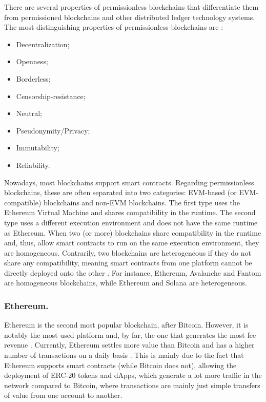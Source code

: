 \documentclass[runningheads]{llncs}
\begin{document}
There are several properties of permissionless blockchains that differentiate them from permissioned blockchains and other distributed ledger technology systems. The most distinguishing properties of permissionless blockchains are \cite{lopp_2020}:
\begin{itemize}
    \item Decentralization;
    \item Openness;
    \item Borderless;
    \item Censorship-resistance;
    \item Neutral;
    \item Pseudonymity/Privacy;
    \item Immutability;
    \item Reliability.
\end{itemize}

Nowadays, most blockchains support smart contracts. Regarding permissionless blockchains, these are often separated into two categories: EVM-based (or EVM-compatible) blockchains and non-EVM blockchains. The first type uses the Ethereum Virtual Machine and shares compatibility in the runtime. The second type uses a different execution environment and does not have the same runtime as Ethereum. When two (or more) blockchains share compatibility in the runtime and, thus, allow smart contracts to run on the same execution environment, they are homogeneous. Contrarily, two blockchains are heterogeneous if they do not share any compatibility, meaning smart contracts from one platform cannot be directly deployed onto the other \cite{abrunhosa_2021}. For instance, Ethereum, Avalanche and Fantom are homogeneous blockchains, while Ethereum and Solana are heterogeneous.

\subsubsection{Ethereum.}
Ethereum is the second most popular blockchain, after Bitcoin. However, it is notably the most used platform and, by far, the one that generates the most fee revenue \cite{fees}. Currently, Ethereum settles more value than Bitcoin \cite{movers} and has a higher number of transactions on a daily basis \cite{glassnode_btc,glassnode_eth}. This is mainly due to the fact that Ethereum supports smart contracts (while Bitcoin does not), allowing the deployment of ERC-20 tokens and dApps, which generate a lot more traffic in the network compared to Bitcoin, where transactions are mainly just simple transfers of value from one account to another.
\end{document}
